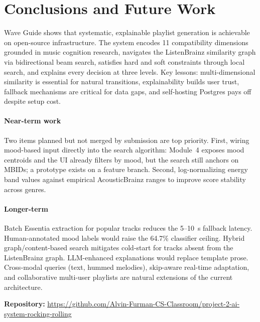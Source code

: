 \section{Conclusions and Future Work}
\label{sec:future}

Wave Guide shows that systematic, explainable playlist generation is achievable on open-source infrastructure. The system encodes 11 compatibility dimensions grounded in music cognition research, navigates the ListenBrainz similarity graph via bidirectional beam search, satisfies hard and soft constraints through local search, and explains every decision at three levels. Key lessons: multi-dimensional similarity is essential for natural transitions, explainability builds user trust, fallback mechanisms are critical for data gaps, and self-hosting Postgres pays off despite setup cost.

\paragraph{Near-term work} Two items planned but not merged by submission are top priority. First, wiring mood-based input directly into the search algorithm: Module~4 exposes mood centroids and the UI already filters by mood, but the search still anchors on MBIDs; a prototype exists on a feature branch. Second, log-normalizing energy band values against empirical AcousticBrainz ranges to improve score stability across genres.

\paragraph{Longer-term} Batch Essentia extraction for popular tracks reduces the 5--10~s fallback latency. Human-annotated mood labels would raise the 64.7\% classifier ceiling. Hybrid graph/content-based search mitigates cold-start for tracks absent from the ListenBrainz graph. LLM-enhanced explanations would replace template prose. Cross-modal queries (text, hummed melodies), skip-aware real-time adaptation, and collaborative multi-user playlists are natural extensions of the current architecture.

\vspace{1em}
\noindent\textbf{Repository:} \url{https://github.com/Alvin-Furman-CS-Classroom/project-2-ai-system-rocking-rolling}
